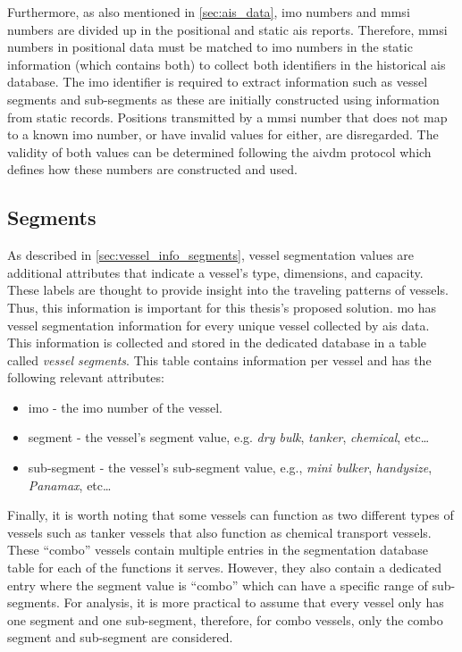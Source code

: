 Furthermore, as also mentioned in \cref{sec:ais_data}, \acrshort{imo} numbers and \acrshort{mmsi} numbers are divided up in the positional and static \acrshort{ais} reports. Therefore, \acrshort{mmsi} numbers in positional data must be matched to \acrshort{imo} numbers in the static information (which contains both) to collect both identifiers in the historical \acrshort{ais} database. The \acrshort{imo} identifier is required to extract information such as vessel segments and sub-segments as these are initially constructed using information from static records. Positions transmitted by a \acrshort{mmsi} number that does not map to a known \acrshort{imo} number, or have invalid values for either, are disregarded. The validity of both values can be determined following the \gls{aivdm} protocol which defines how these numbers are constructed and used.

\subsection{Segments}

As described in \cref{sec:vessel_info_segments}, vessel segmentation values are additional attributes that indicate a vessel's type, dimensions, and capacity. These labels are thought to provide insight into the traveling patterns of vessels. Thus, this information is important for this thesis's proposed solution. \acrshort{mo} has vessel segmentation information for every unique vessel collected by \acrshort{ais} data. This information is collected and stored in the dedicated database in a table called \textit{vessel segments}. This table contains information per vessel and has the following relevant attributes:

\begin{itemize}
    \item imo - the \acrshort{imo} number of the vessel.
    \item segment - the vessel's segment value, e.g. \textit{dry bulk}, \textit{tanker}, \textit{chemical}, etc\ldots
    \item sub-segment - the vessel's sub-segment value, e.g., \textit{mini bulker}, \textit{handysize}, \textit{Panamax}, etc\ldots
\end{itemize}

Finally, it is worth noting that some vessels can function as two different types of vessels such as tanker vessels that also function as chemical transport vessels. These ``combo'' vessels contain multiple entries in the segmentation database table for each of the functions it serves. However, they also contain a dedicated entry where the segment value is ``combo'' which can have a specific range of sub-segments. For analysis, it is more practical to assume that every vessel only has one segment and one sub-segment, therefore, for combo vessels, only the combo segment and sub-segment are considered.

